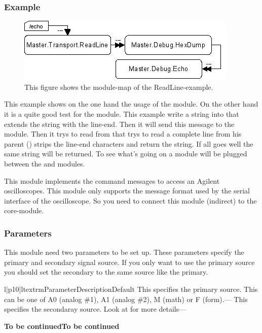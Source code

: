 \subsubsection{Example}
\begin{figure}[ht]
    \label{fig:coremod10}
    \centering
    \includegraphics{coremod10.png}
    \caption{This figure shows the module-map of the ReadLine-example.}
\end{figure}    
This example shows on the one hand the usage of the  module.
On the other hand it is a quite good test for the  module. 
This example write a string into  that extends the string 
with the line-end. Then it will send this message to the  module.
Then it trys to read from  that trys to read a complete 
line from his parent () strips the line-end characters and
return the string. If all goes well the same string will be returned. To see
what's going on a  module will be plugged between the 
 and  modules.




%
%
This module implements the command messages to access an Agilent 
oscilloscopes. This module only supports the message format used 
by the serial interface of the oscilloscope. So you need to connect
this module (indirect) to the 
core-module.

\subsubsection{Parameters}
This module need two parameters to be set up. These parameters specify the
primary and secondary signal source. If you only want to use the primary
source you should set the secondary to the same source like the primary.
\begin{tableiii}{l|p{10}|l}{textrm}{Parameter}{Description}{Default}
        {This specifies the primary source. This can be one of A0 (analog \#1),
         A1 (analog \#2), M (math) or F (form).}{---}
        {This specifies the secondaray source. Look at  for more
         details}{---}
\end{tableiii}         
\bf{To be continued}\bf{To be continued}

